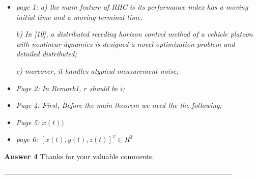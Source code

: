 \documentclass[a4paper]{article}
\begin{document}
\begin{itemize}
\item  \textit {page 1: a) the main feature of RHC is its performance index has a moving initial time and a moving terminal time.}

    \textit{ b) In [10], a distributed receding horizon control method of a vehicle platoon with nonlinear dynamics is designed a novel optimization problem and detailed distributed;}

    \textit{c) moreover, it handles atypical measurement noise;}

\item \textit{Page 2: In Remark1, $r$ should be $i$;}
\item \textit{Page 4: First, Before the main theorem we need the the following;}
\item \textit{Page 5: $\dot{x}(t))$}
\item \textit{page 6: $[x(t), y(t), z(t)]^{T} \in R^{3}$}
\end{itemize}


\textbf{Answer 4} Thanks for your valuable comments.

------------------------------------------------------------------------------------------------
\end{document}
